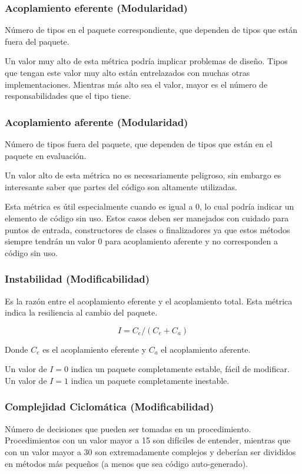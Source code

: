 \subsubsection{Acoplamiento eferente (Modularidad)}
Número de tipos en el paquete correspondiente, que dependen de tipos que están fuera del paquete.

Un valor muy alto de esta métrica podría implicar problemas de diseño. Tipos que tengan este valor muy
alto están entrelazados con muchas otras implementaciones. Mientras más alto sea el valor, mayor es el número
de responsabilidades que el tipo tiene.

\subsubsection{Acoplamiento aferente (Modularidad)}
Número de tipos fuera del paquete, que dependen de tipos que están en el paquete en evaluación.

Un valor alto de esta métrica no es necesariamente peligroso, sin embargo es interesante saber que partes
del código son altamente utilizadas.

Esta métrica es útil especialmente cuando es igual a $0$, lo cual podría indicar un elemento de código sin
uso. Estos casos deben ser manejados con cuidado para puntos de entrada, constructores de clases o
finalizadores ya que estos métodos siempre tendrán un valor $0$ para acoplamiento aferente y no
corresponden a código sin uso.

\subsubsection{Instabilidad (Modificabilidad)}

Es la razón entre el acoplamiento eferente y el acoplamiento total. Esta métrica indica la resiliencia 
al cambio del paquete.

\begin{equation*}
I = C_e / (C_e + C_a)
\end{equation*}

Donde $C_e$ es el acoplamiento eferente y $C_a$ el acoplamiento aferente.

Un valor de $I=0$ indica un paquete completamente estable, fácil de modificar. Un valor de $I=1$ indica
un paquete completamente inestable.

\subsubsection{Complejidad Ciclomática (Modificabilidad)}
Número de decisiones que pueden ser tomadas en un procedimiento.
Procedimientos con un valor mayor a 15 son difíciles de entender, mientras que con un valor mayor a 30
son extremadamente complejos y deberían ser divididos en métodos más pequeños (a menos que sea código
auto-generado).

